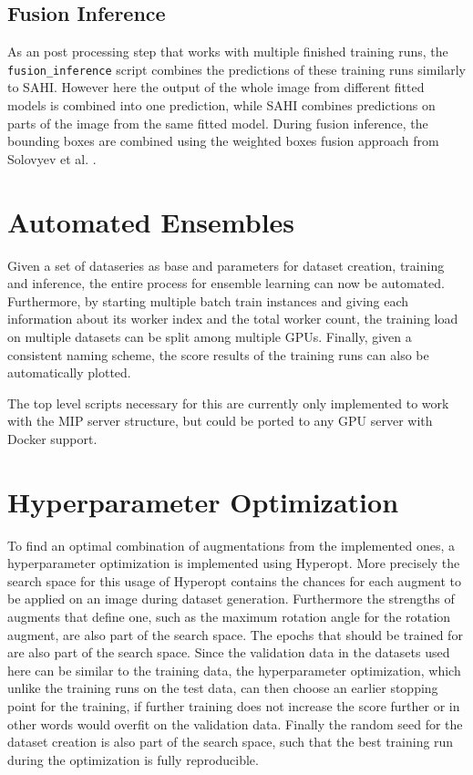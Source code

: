 \documentclass[10pt]{book}
\begin{document}
\subsection{Fusion Inference}

As an post processing step that works with multiple finished training runs, the \texttt{fusion\_inference} script combines the predictions of these training runs similarly to \ac{SAHI}. However here the output of the whole image from different fitted models is combined into one prediction, while \ac{SAHI} combines predictions on parts of the image from the same fitted model. During fusion inference, the bounding boxes are combined using the weighted boxes fusion approach from Solovyev et al. \cite{solovyev2021weighted}.


\section{Automated Ensembles}

Given a set of dataseries as base and parameters for dataset creation, training and inference, the entire process for ensemble learning can now be automated. Furthermore, by starting multiple batch train instances and giving each information about its worker index and the total worker count, the training load on multiple datasets can be split among multiple \acp{GPU}. Finally, given a consistent naming scheme, the score results of the training runs can also be automatically plotted.

The top level scripts necessary for this are currently only implemented to work with the \ac{MIP} server structure, but could be ported to any \ac{GPU} server with Docker support.

\section{Hyperparameter Optimization}

To find an optimal combination of augmentations from the implemented ones, a hyperparameter optimization is implemented using Hyperopt. More precisely the search space for this usage of Hyperopt contains the chances for each augment to be applied on an image during dataset generation. Furthermore the strengths of augments that define one, such as the maximum rotation angle for the rotation augment, are also part of the search space. The epochs that should be trained for are also part of the search space. Since the validation data in the datasets used here can be similar to the training data, the hyperparameter optimization, which unlike the training runs on the test data, can then choose an earlier stopping point for the training, if further training does not increase the score further or in other words would overfit on the validation data. Finally the random seed for the dataset creation is also part of the search space, such that the best training run during the optimization is fully reproducible.
\end{document}
